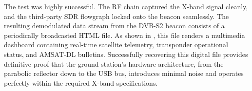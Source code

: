 The test was highly successful. The RF chain captured the X-band signal cleanly, and the third-party SDR flowgraph locked onto the beacon seamlessly. The resulting demodulated data stream from the DVB-S2 beacon consists of a periodically broadcasted HTML file. As shown in , this file renders a multimedia dashboard containing real-time satellite telemetry, transponder operational status, and AMSAT-DL bulletins. Successfully recovering this digital file provides definitive proof that the ground station's hardware architecture, from the parabolic reflector down to the USB bus, introduces minimal noise and operates perfectly within the required X-band specifications.